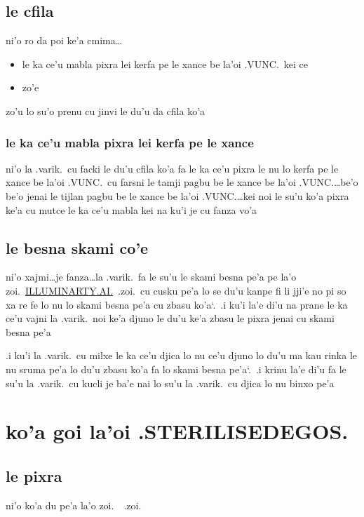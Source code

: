 \documentclass{report}
\newcommand\sds{\spacefactor\sfcode`.\ \space}
\begin{document}
\section{le cfila}

ni'o ro da poi ke'a cmima\ldots

\begin{itemize}
	\item le ka ce'u mabla pixra lei kerfa pe le xance be la'oi .VUNC.\ kei ce
	\item zo'e
\end{itemize}

zo'u lo su'o prenu cu jinvi le du'u da cfila ko'a

\subsection{le ka ce'u mabla pixra lei kerfa pe le xance}
ni'o la .varik.\ cu facki le du'u cfila ko'a fa le ka ce'u pixra le nu lo kerfa pe le xance be la'oi .VUNC.\ cu farsni le tamji pagbu be le xance be la'oi .VUNC.\ldots be'o be'o jenai le tijlan pagbu be le xance be la'oi .VUNC.\ldots kei noi le su'u ko'a pixra ke'a cu mutce le ka ce'u mabla kei na ku'i je cu fanza vo'a

\section{le besna skami co'e}
ni'o xajmi\ldots je fanza\ldots la .varik.\ fa le su'u le skami besna pe'a pe la'o zoi.\ \url{ILLUMINARTY.AI.}\ .zoi.\ cu cusku pe'a lo se du'u kanpe fi li jji'e no pi so xa re fe lo nu lo skami besna pe'a cu zbasu ko'a\sds  .i ku'i la'e di'u na prane le ka ce'u vajni la .varik.\ noi ke'a djuno le du'u ke'a zbasu le pixra jenai cu skami besna pe'a

.i ku'i la .varik.\ cu milxe le ka ce'u djica lo nu ce'u djuno lo du'u ma kau rinka le nu sruma pe'a lo du'u zbasu ko'a fa lo skami besna pe'a\sds  .i krinu la'e di'u fa le su'u la .varik.\ cu kucli je ba'e nai lo su'u la .varik.\ cu djica lo nu binxo pe'a

\chapter{ko'a goi la'oi .STERILISEDEGOS.}

\section{le pixra}
ni'o ko'a du pe'a la'o zoi.\ \ .zoi.
\end{document}
